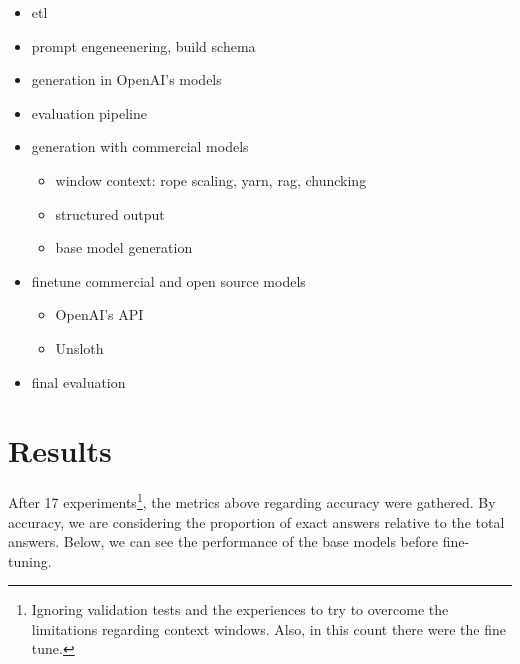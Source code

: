 \documentclass[
  12pt,
]{article}
\providecommand{\tightlist}{%
  \setlength{\itemsep}{0pt}\setlength{\parskip}{0pt}}\usepackage{longtable,booktabs,array}
\begin{document}
\begin{itemize}
\tightlist
\item
  etl
\item
  prompt engeneenering, build schema
\item
  generation in OpenAI's models
\item
  evaluation pipeline
\item
  generation with commercial models

  \begin{itemize}
  \tightlist
  \item
    window context: rope scaling, yarn, rag, chuncking
  \item
    structured output
  \item
    base model generation
  \end{itemize}
\item
  finetune commercial and open source models

  \begin{itemize}
  \tightlist
  \item
    OpenAI's API
  \item
    Unsloth
  \end{itemize}
\item
  final evaluation
\end{itemize}

\section{Results}\label{results}

After 17 experiments\footnote{Ignoring validation tests and the
  experiences to try to overcome the limitations regarding context
  windows. Also, in this count there were the fine tune.}, the metrics
above regarding accuracy were gathered. By accuracy, we are considering
the proportion of exact answers relative to the total answers. Below, we
can see the performance of the base models before fine-tuning.
\end{document}
